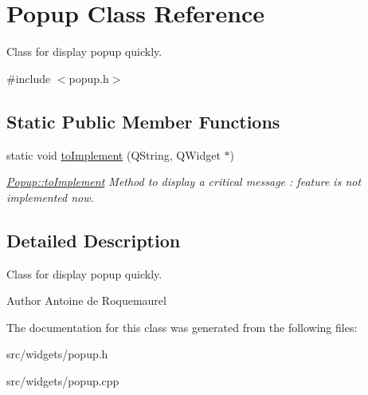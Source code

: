 \hypertarget{classPopup}{\section{Popup Class Reference}
\label{classPopup}
}


Class for display popup quickly.  




{\ttfamily \#include $<$popup.\+h$>$}

\subsection*{Static Public Member Functions}
\begin{DoxyCompactItemize}
\item 
\hypertarget{classPopup_aa3173e0f473b42f08363c4ef17c93a07}{static void \hyperlink{classPopup_aa3173e0f473b42f08363c4ef17c93a07}{to\+Implement} (Q\+String, Q\+Widget $\ast$)}\label{classPopup_aa3173e0f473b42f08363c4ef17c93a07}

\begin{DoxyCompactList}\small\item\em \hyperlink{classPopup_aa3173e0f473b42f08363c4ef17c93a07}{Popup\+::to\+Implement} Method to display a critical message \+: feature is not implemented now. \end{DoxyCompactList}\end{DoxyCompactItemize}


\subsection{Detailed Description}
Class for display popup quickly. 

\begin{DoxyAuthor}{Author}
Antoine de Roquemaurel 
\end{DoxyAuthor}


The documentation for this class was generated from the following files\+:\begin{DoxyCompactItemize}
\item 
src/widgets/popup.\+h\item 
src/widgets/popup.\+cpp\end{DoxyCompactItemize}

